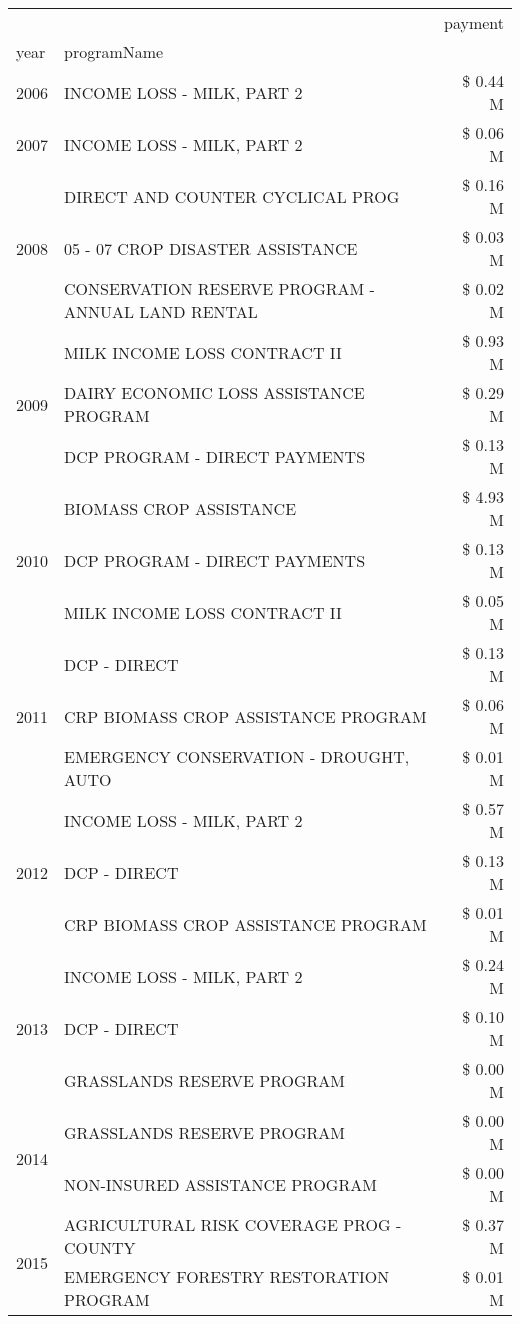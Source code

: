 \begin{tabular}{llr}
\toprule
 &  & payment \\
year & programName &  \\
\midrule
2006 & INCOME LOSS - MILK, PART 2 & \$ 0.44 M \\
\cline{1-3}
2007 & INCOME LOSS - MILK, PART 2 & \$ 0.06 M \\
\cline{1-3}
\multirow[t]{3}{*}{2008} & DIRECT AND COUNTER CYCLICAL PROG & \$ 0.16 M \\
 & 05 - 07 CROP DISASTER ASSISTANCE & \$ 0.03 M \\
 & CONSERVATION RESERVE PROGRAM - ANNUAL LAND RENTAL & \$ 0.02 M \\
\cline{1-3}
\multirow[t]{3}{*}{2009} & MILK INCOME LOSS CONTRACT II & \$ 0.93 M \\
 & DAIRY ECONOMIC LOSS ASSISTANCE PROGRAM & \$ 0.29 M \\
 & DCP PROGRAM - DIRECT PAYMENTS & \$ 0.13 M \\
\cline{1-3}
\multirow[t]{3}{*}{2010} & BIOMASS CROP ASSISTANCE & \$ 4.93 M \\
 & DCP PROGRAM - DIRECT PAYMENTS & \$ 0.13 M \\
 & MILK INCOME LOSS CONTRACT II & \$ 0.05 M \\
\cline{1-3}
\multirow[t]{3}{*}{2011} & DCP - DIRECT & \$ 0.13 M \\
 & CRP BIOMASS CROP ASSISTANCE PROGRAM & \$ 0.06 M \\
 & EMERGENCY CONSERVATION - DROUGHT, AUTO & \$ 0.01 M \\
\cline{1-3}
\multirow[t]{3}{*}{2012} & INCOME LOSS - MILK, PART 2 & \$ 0.57 M \\
 & DCP - DIRECT & \$ 0.13 M \\
 & CRP BIOMASS CROP ASSISTANCE PROGRAM & \$ 0.01 M \\
\cline{1-3}
\multirow[t]{3}{*}{2013} & INCOME LOSS - MILK, PART 2 & \$ 0.24 M \\
 & DCP - DIRECT & \$ 0.10 M \\
 & GRASSLANDS RESERVE PROGRAM & \$ 0.00 M \\
\cline{1-3}
\multirow[t]{2}{*}{2014} & GRASSLANDS RESERVE PROGRAM & \$ 0.00 M \\
 & NON-INSURED ASSISTANCE PROGRAM & \$ 0.00 M \\
\cline{1-3}
\multirow[t]{3}{*}{2015} & AGRICULTURAL RISK COVERAGE PROG - COUNTY & \$ 0.37 M \\
 & EMERGENCY FORESTRY RESTORATION PROGRAM & \$ 0.01 M \\

\end{tabular}
